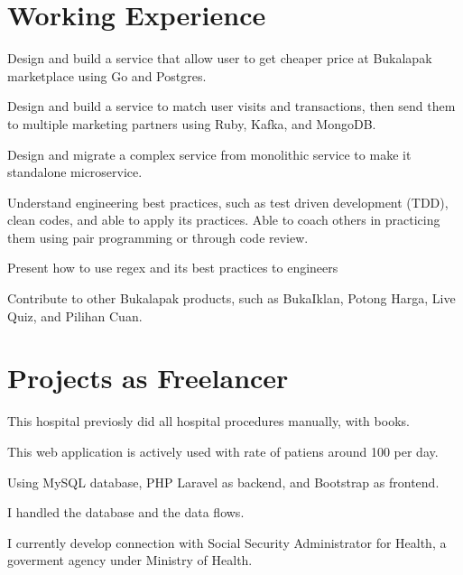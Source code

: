 \documentclass[letterpaper]{deedy-resume} %
\begin{document}
\hfill
\begin{minipage}[t]{0.66\textwidth} %


\section{Working Experience}

\vspace{\topsep} %
\begin{tightitemize}
\item Design and build a service that allow user to get cheaper price at Bukalapak marketplace using Go and Postgres.
\item Design and build a service to match user visits and transactions, then send them to multiple marketing partners using Ruby, Kafka, and MongoDB.
\item Design and migrate a complex service from monolithic service to make it standalone microservice.
\item Understand engineering best practices, such as test driven development (TDD), clean codes, and able to apply its practices. Able to coach others in practicing them using pair programming or through code review.
\item Present how to use regex and its best practices to engineers
\item Contribute to other Bukalapak products, such as BukaIklan, Potong Harga, Live Quiz, and Pilihan Cuan.
\end{tightitemize}


\section{Projects as Freelancer}

\begin{tightitemize}
\item This hospital previosly did all hospital procedures manually, with books.
\item This web application is actively used with rate of patiens around 100 per day.
\item Using MySQL database, PHP Laravel as backend, and Bootstrap as frontend.
\item I handled the database and the data flows.
\item I currently develop connection with Social Security Administrator for Health, a goverment agency under Ministry of Health.
\end{tightitemize}
\sectionspace


\end{minipage}
\end{document}
